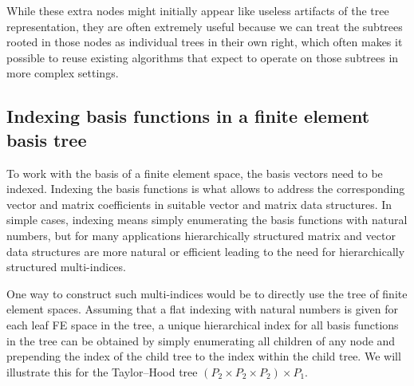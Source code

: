 \documentclass[a4paper,10pt,headings=normal,bibliography=totoc]{scrartcl}
\begin{document}
While these extra nodes might initially appear like useless artifacts of the tree representation, they are often extremely useful
because we can treat the subtrees rooted in those nodes as individual trees in their own right, which often makes it possible to
reuse existing algorithms that expect to operate on those subtrees in more complex settings.




\subsection{Indexing basis functions in a finite element basis tree}
\label{sec:dune_functions:basis_ordering}

To work with the basis of a finite element space, the basis vectors need to be indexed.  Indexing the basis functions
is what allows to address the corresponding vector and matrix coefficients in suitable vector and matrix data structures.
In simple cases, indexing means simply enumerating the basis functions with natural numbers, but for many applications
hierarchically structured matrix and vector data structures are more natural or efficient leading to the need
for hierarchically structured multi-indices.

One way to construct such multi-indices would be to directly use the tree of finite element spaces.
Assuming that a flat indexing with natural numbers is given for each leaf FE space in the tree,
a unique hierarchical index for all basis functions in the tree can be obtained by simply
enumerating all children of any node and prepending the index of the child tree to the index
within the child tree.
We will illustrate this for the Taylor--Hood tree $(P_2 \times P_2 \times P_2) \times P_1$.
\end{document}
